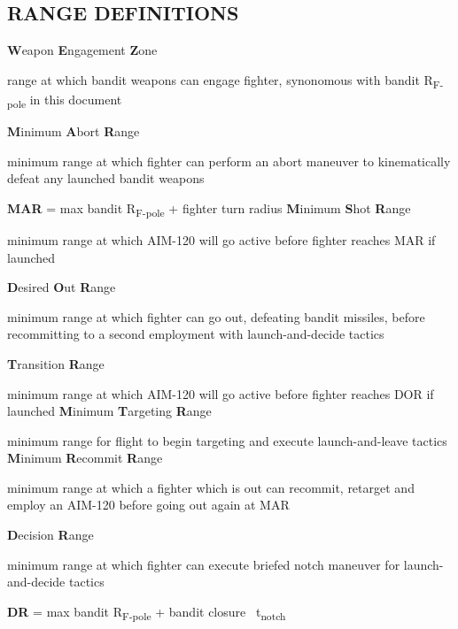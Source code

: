 \subsection{RANGE DEFINITIONS}

\begin{tcoloritemize}
     \textbf{W}eapon \textbf{E}ngagement \textbf{Z}one

    \medskip
    range at which bandit weapons can engage fighter, synonomous with bandit R\textsubscript{F-pole} in this document

    \blueitem[MAR] \textbf{M}inimum \textbf{A}bort \textbf{R}ange

    \medskip
    minimum range at which fighter can perform an abort maneuver to kinematically defeat any launched bandit weapons 

    \medskip
    \textbf{MAR} = max bandit R\textsubscript{F-pole} + fighter turn radius
    \blueitem[MSR] \textbf{M}inimum \textbf{S}hot \textbf{R}ange

    \medskip
    minimum range at which AIM-120 will go active before fighter reaches MAR if launched

    \blueitem[DOR] \textbf{D}esired \textbf{O}ut \textbf{R}ange

    \medskip
    minimum range at which fighter can go out, defeating bandit missiles, 
    before recommitting to a second employment with launch-and-decide tactics

    \blueitem[TR] \textbf{T}ransition \textbf{R}ange

    \medskip
    minimum range at which AIM-120 will go active before fighter reaches DOR if launched
    \blueitem[MTR] \textbf{M}inimum \textbf{T}argeting \textbf{R}ange

    \medskip
    minimum range for flight to begin targeting and execute launch-and-leave tactics
    \blueitem[MRR] \textbf{M}inimum \textbf{R}ecommit \textbf{R}ange

    \medskip
    minimum range at which a fighter which is out can recommit, 
    retarget and employ an AIM-120 before going out again at MAR

    \blueitem[DR] \textbf{D}ecision \textbf{R}ange

    \medskip
    minimum range at which fighter can execute briefed notch maneuver for launch-and-decide tactics

    \medskip

    \textbf{DR} = max bandit R\textsubscript{F-pole} + bandit closure \times \ t\textsubscript{notch}
\end{tcoloritemize}

